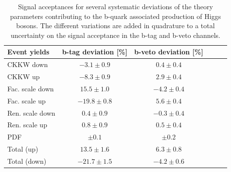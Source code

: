 \begin{table}[tdp]
  \begin{center}
   \label{table:sys_bba}
   \begin{tabular}{lccccc}
\hline \hline
 Event yields       & b-tag deviation [\%]  & b-veto deviation [\%] \\
\hline
CKKW down &    $ -3.1 \pm 0.9 $ &      $ 0.4 \pm 0.4 $ \\
CKKW up &     $ -8.3 \pm 0.9 $ &      $ 2.9 \pm 0.4 $ \\
Fac. scale down &    $ 15.5 \pm 1.0 $ &   $ -4.2 \pm 0.4 $ \\
Fac. scale up &     $ -19.8 \pm 0.8 $ &    $ 5.6 \pm 0.4 $ \\
Ren. scale down &      $ 0.4 \pm 0.9 $ &     $ -0.3 \pm 0.4 $ \\
Ren. scale up &     $ 0.8 \pm 0.9 $ &      $ 0.5 \pm 0.4 $ \\
PDF &     $\pm 0.1 $ 		& $\pm 0.2 $ \\
\hline
Total  (up) &     $ 13.5 \pm 1.6$ &                    $ 6.3 \pm 0.8$ \\
Total  (down) &     $ -21.7 \pm 1.5$ &                    $ -4.2 \pm 0.6$ \\ 
\hline \hline
	\end{tabular}
   \caption{Signal acceptances for several systematic deviations of the theory parameters contributing to the b-quark associated production of Higgs bosons. The different variations are added in quadrature to a total uncertainty on the signal acceptance in the b-tag and b-veto channels.}
  \end{center}
\end{table}


